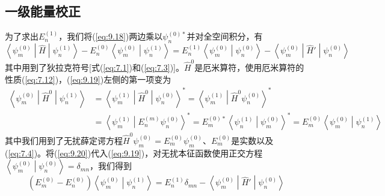 \subsection*{一级能量校正}

    为了求出$E_n^{\left(1\right)}$，我们将(\ref{eq:9.18})两边乘以$\psi_n^{\left(0\right)\ast}$并对全空间积分，有
    \begin{equation}
        \left\langle \psi_m^{\left(0\right)} \middle| \hat{H} \middle| \psi_n^{\left(1\right)} \right\rangle - E_n^{\left(0\right)} \left\langle \psi_m^{\left(0\right)} \middle| \psi_n^{\left(1\right)} \right\rangle = E_n^{\left(1\right)} \left\langle \psi_m^{\left(0\right)} \middle| \psi_n^{\left(0\right)} \right\rangle - \left\langle \psi_m^{\left(0\right)} \middle| \hat{H}' \middle| \psi_n^{\left(0\right)} \right\rangle
        \label{eq:9.19}
    \end{equation}
    其中用到了狄拉克符号[式(\ref{eq:7.1})和(\ref{eq:7.3})]。$\hat{H}^0$是厄米算符，使用厄米算符的性质(\ref{eq:7.12})，(\ref{eq:9.19})左侧的第一项变为
    \begin{equation}
        \begin{aligned}
            \left\langle \psi_m^{\left(0\right)} \middle| \hat{H}^0 \middle| \psi_n^{\left(1\right)} \right\rangle &= \left\langle \psi_m^{\left(1\right)} \middle| \hat{H}^0 \middle| \psi_n^{\left(0\right)} \right\rangle^{\ast} = \left\langle \psi_m^{\left(1\right)} \middle| \hat{H}^0 \psi_n^{\left(0\right)} \right\rangle^{\ast} \\
            &= \left\langle \psi_m^{\left(1\right)} \middle| E_n^{\left(m\right)} \psi_n^{\left(0\right)} \right\rangle^{\ast} = E_m^{\left(0\right)\ast} \left\langle \psi_n^{\left(1\right)} \middle| \psi_m^{\left(0\right)} \right\rangle^{\ast} = E_m^{\left(0\right)} \left\langle \psi_m^{\left(0\right)} \middle| \psi_n^{\left(1\right)} \right\rangle
        \end{aligned}
        \label{eq:9.20}
    \end{equation}
    其中我们用到了无扰薛定谔方程$\hat{H}^0 \psi_m^{\left(0\right)} = E_m^{\left(0\right)} \psi_m^{\left(0\right)}$、$E_m^{\left(0\right)}$是实数以及(\ref{eq:7.4})。将(\ref{eq:9.20})代入(\ref{eq:9.19})，对无扰本征函数使用正交方程$\left\langle \psi_m^{\left(0\right)} \middle| \psi_n^{\left(0\right)} \right\rangle = \delta_{mn}$，我们得到
    \begin{equation}
        \left(E_m^{\left(0\right)} - E_n^{\left(0\right)}\right)\left\langle \psi_m^{\left(0\right)} \middle| \psi_n^{\left(1\right)} \right\rangle = E_n^{\left(1\right)}\delta_{mn} - \left\langle \psi_m^{\left(0\right)} \middle| \hat{H}' \middle| \psi_n^{\left(0\right)} \right\rangle
        \label{eq:9.21}
    \end{equation}
